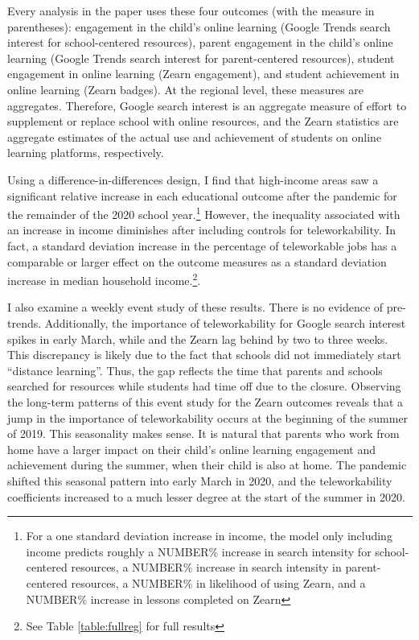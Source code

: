 Every analysis in the paper uses these four outcomes (with the measure in parentheses): engagement in the child's online learning (Google Trends search interest for school-centered resources), parent engagement in the child's online learning (Google Trends search interest for parent-centered resources), student engagement in online learning (Zearn engagement), and student achievement in online learning (Zearn badges).
At the regional level, these measures are aggregates.
Therefore, Google search interest is an aggregate measure of effort to supplement or replace school with online resources, and the Zearn statistics are aggregate estimates of the actual use and achievement of students on online learning platforms, respectively.

Using a difference-in-differences design, I find that high-income areas saw a significant relative increase in each educational outcome after the pandemic for the remainder of the 2020 school year.\footnote{For a one standard deviation increase in income, the model only including income predicts roughly a NUMBER\% increase in search intensity for school-centered resources, a NUMBER\% increase in search intensity in parent-centered resources, a NUMBER\% in likelihood of using Zearn, and a NUMBER\% increase in lessons completed on Zearn}
However, the inequality associated with an increase in income diminishes after including controls for teleworkability.
In fact, a standard deviation increase in the percentage of teleworkable jobs has a comparable or larger effect on the outcome measures as a standard deviation increase in median household income.\footnote{See Table \ref{table:fullreg} for full results}.

I also examine a weekly event study of these results.
There is no evidence of pre-trends.
Additionally, the importance of teleworkability for Google search interest spikes in early March, while and the Zearn lag behind by two to three weeks.
This discrepancy is likely due to the fact that schools did not immediately start ``distance learning''.
Thus, the gap reflects the time that parents and schools searched for resources while students had time off due to the closure.
Observing the long-term patterns of this event study for the Zearn outcomes reveals that a jump in the importance of teleworkability occurs at the beginning of the summer of 2019.
This seasonality makes sense.
It is natural that parents who work from home have a larger impact on their child's online learning engagement and achievement during the summer, when their child is also at home.
The pandemic shifted this seasonal pattern into early March in 2020, and the teleworkability coefficients increased to a much lesser degree at the start of the summer in 2020.

